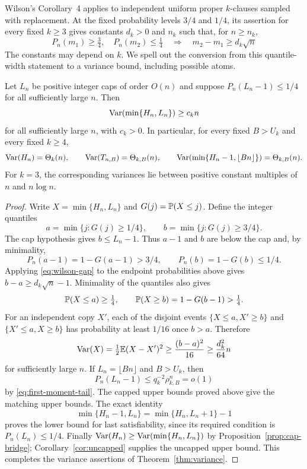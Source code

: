 Wilson's Corollary~4 \cite{Wilson} applies to independent uniform proper
$k$-clauses sampled with replacement. At the fixed probability levels
$3/4$ and $1/4$, its assertion for every fixed $k\ge3$ gives constants
$d_k>0$ and $n_k$ such that, for $n\ge n_k$,
\begin{equation}\label{eq:wilson-gap}
 P_n(m_1)\ge\tfrac34,\quad P_n(m_2)\le\tfrac14
 \quad\Longrightarrow\quad m_2-m_1\ge d_k\sqrt n
\end{equation}
The constants may depend on $k$. We spell out the conversion from this
quantile-width statement to a variance bound, including possible atoms.

\begin{proposition}
\label{prop:variance-lower}
Let $L_n$ be positive integer caps of order $O(n)$ and suppose
$P_n(L_n-1)\le1/4$ for all sufficiently large $n$. Then
\[
 \operatorname{Var}(\min\{H_n,L_n\})\ge c_k n
\]
for all sufficiently large $n$, with $c_k>0$.
In particular, for every fixed $B>U_k$ and every fixed
$k\ge4$,
\begin{equation}\label{eq:sharp-variance}
 \operatorname{Var}(H_n)=\Theta_k(n),\qquad
 \operatorname{Var}(T_{n,B})=\Theta_{k,B}(n),\qquad
 \operatorname{Var}(\min\{H_n-1,\lfloor Bn\rfloor\})=\Theta_{k,B}(n).
\end{equation}
For $k=3$, the corresponding variances lie between positive constant
multiples of $n$ and $n\log n$.
\end{proposition}

\begin{proof}
Write $X=\min\{H_n,L_n\}$ and $G(j)=\mathbb P(X\le j)$. Define the integer
quantiles
\[
 a=\min\{j:G(j)\ge1/4\},\qquad
 b=\min\{j:G(j)\ge3/4\}.
\]
The cap hypothesis gives $b\le L_n-1$. Thus $a-1$ and $b$ are below the
cap and, by minimality,
\[
 P_n(a-1)=1-G(a-1)>3/4,\qquad P_n(b)=1-G(b)\le1/4.
\]
Applying \eqref{eq:wilson-gap} to the endpoint probabilities above gives
$b-a\ge d_k\sqrt n-1$.
Minimality of the quantiles also gives
\[
 \mathbb P(X\le a)\ge\tfrac14,\qquad
 \mathbb P(X\ge b)=1-G(b-1)>\tfrac14.
\]
For an independent copy $X'$, each of the disjoint events
$\{X\le a,X'\ge b\}$ and $\{X'\le a,X\ge b\}$ has probability at
least $1/16$ once $b>a$. Therefore
\[
 \operatorname{Var}(X)=\tfrac12\mathbb E(X-X')^2
 \ge\frac{(b-a)^2}{16}
 \ge\frac{d_k^2}{64}n
\]
for sufficiently large $n$.
If $L_n=\lfloor Bn\rfloor$ and $B>U_k$, then
\[
 P_n(L_n-1)\le q_k^{-2}\rho_{k,B}^n=o(1)
\]
by \eqref{eq:first-moment-tail}. The capped upper bounds proved above give the
matching upper bounds. The exact identity
\[
 \min\{H_n-1,L_n\}=\min\{H_n,L_n+1\}-1
\]
proves the lower bound for last satisfiability, since its required
condition is $P_n(L_n)\le1/4$. Finally
$\operatorname{Var}(H_n)\ge\operatorname{Var}(\min\{H_n,L_n\})$ by
Proposition~\ref{prop:cap-bridge}; Corollary~\ref{cor:uncapped} supplies
the uncapped upper bound.
This completes the variance assertions of Theorem~\ref{thm:variance}.
\end{proof}
